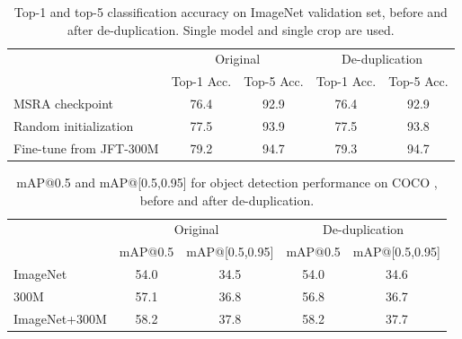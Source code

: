 \begin{table*}[h]
\centering
\renewcommand{\arraystretch}{1.1}
\renewcommand{\tabcolsep}{1.2mm}
\begin{tabular}{@{} l | c  c | c  c @{}}
& \multicolumn{2}{c|}{Original} & \multicolumn{2}{c}{De-duplication} \\
& Top-1 Acc. & Top-5 Acc. & Top-1 Acc. & Top-5 Acc. \\
\hline
MSRA checkpoint & 76.4 & 92.9 & 76.4 & 92.9 \\
Random initialization & 77.5 & 93.9 & 77.5 & 93.8 \\
Fine-tune from JFT-300M & 79.2 & 94.7 & 79.3 & 94.7 \\
\end{tabular}
\vspace{0.05in}
\caption{Top-1 and top-5 classification accuracy on ImageNet validation set, before and after de-duplication. Single model and single crop are used.}
\label{tab:imagenet_dedup}
\end{table*}
\vspace{-0.1in}

\begin{table*}[h]
\centering
\renewcommand{\arraystretch}{1.1}
\renewcommand{\tabcolsep}{1.2mm}
\begin{tabular}{@{} l | c  c | c  c @{}}
& \multicolumn{2}{c|}{Original} & \multicolumn{2}{c}{De-duplication} \\
& mAP@0.5 & mAP@[0.5,0.95] & mAP@0.5 & mAP@[0.5,0.95] \\
\hline
ImageNet & 54.0 & 34.5 & 54.0 & 34.6 \\
300M & 57.1 & 36.8 & 56.8 & 36.7 \\
ImageNet+300M & 58.2 & 37.8 & 58.2 & 37.7 \\
\end{tabular}
\vspace{0.07in}
\caption{mAP@0.5 and mAP@[0.5,0.95] for object detection performance on COCO \minival, before and after de-duplication.}
\label{tab:coco_dedup}
\end{table*}
\vspace{-0.1in}

